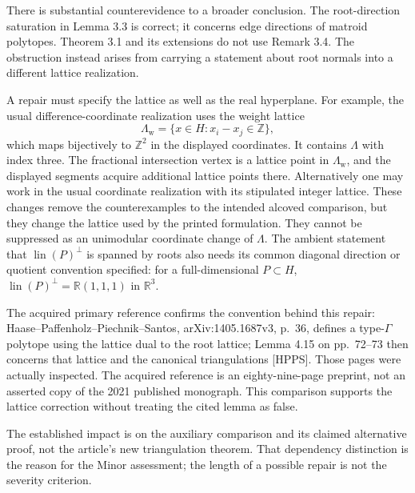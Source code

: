 \documentclass[10pt]{article}
\begin{document}
There is substantial counterevidence to a broader conclusion. The root-direction saturation in Lemma 3.3 is correct; it concerns edge directions of matroid polytopes. Theorem 3.1 and its extensions do not use Remark 3.4. The obstruction instead arises from carrying a statement about root normals into a different lattice realization.\par
A repair must specify the lattice as well as the real hyperplane. For example, the usual difference-coordinate realization uses the weight lattice \[\Lambda_{\mathrm w}
 =\{x\in H:x_i-x_j\in\mathbb Z\},\] which maps bijectively to \(\mathbb Z^2\) in the displayed coordinates. It contains \(\Lambda\) with index three. The fractional intersection vertex is a lattice point in \(\Lambda_{\mathrm w}\), and the displayed segments acquire additional lattice points there. Alternatively one may work in the usual coordinate realization with its stipulated integer lattice. These changes remove the counterexamples to the intended alcoved comparison, but they change the lattice used by the printed formulation. They cannot be suppressed as an unimodular coordinate change of \(\Lambda\). The ambient statement that \(\operatorname{lin}(P)^\perp\) is spanned by roots also needs its common diagonal direction or quotient convention specified: for a full-dimensional \(P\subset H\), \(\operatorname{lin}(P)^\perp=\mathbb R(1,1,1)\) in \(\mathbb R^3\).\par
The acquired primary reference confirms the convention behind this repair: Haase–Paffenholz–Piechnik–Santos, arXiv:1405.1687v3, p. 36, defines a type-\(\Gamma\) polytope using the lattice dual to the root lattice; Lemma 4.15 on pp. 72–73 then concerns that lattice and the canonical triangulations [HPPS]. Those pages were actually inspected. The acquired reference is an eighty-nine-page preprint, not an asserted copy of the 2021 published monograph. This comparison supports the lattice correction without treating the cited lemma as false.\par
The established impact is on the auxiliary comparison and its claimed alternative proof, not the article’s new triangulation theorem. That dependency distinction is the reason for the Minor assessment; the length of a possible repair is not the severity criterion.\par
\end{document}
